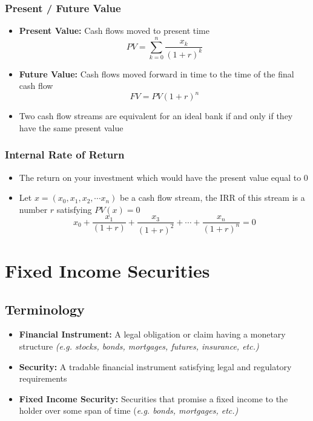 \documentclass[11pt]{article}
\begin{document}
\subsubsection{Present / Future Value}
\begin{itemize}
\item \textbf{Present Value:} Cash flows moved to present time 
$$ PV = \sum_{k=0}^{n} \frac{x_k}{(1+r)^k}$$
\item \textbf{Future Value:} Cash flows moved forward in time to the time of the final cash flow
$$ FV = PV (1+r)^n$$
\item Two cash flow streams are equivalent for an ideal bank if and only if they have the same present value 
\end{itemize}

\subsubsection{Internal Rate of Return}
\begin{itemize}
\item The return on your investment which would have the present value equal to 0
\item Let $x = (x_0, x_1, x_2, \cdots x_n)$ be a cash flow stream, the IRR of this stream is a number $r$ satisfying $PV(x) = 0$ 
$$ x_0 + \frac{x_1}{(1+r)} + \frac{x_3}{(1+r)^2} + \cdots + \frac{x_n}{(1+r)^n} = 0$$
\end{itemize}

\pagebreak

\section{Fixed Income Securities}
\subsection{Terminology}
\begin{itemize}
\item \textbf{Financial Instrument:} A legal obligation or claim having a monetary structure \textit{(e.g. stocks, bonds, mortgages, futures, insurance, etc.)}
\item \textbf{Security:} A tradable financial instrument satisfying legal and regulatory requirements 
\item \textbf{Fixed Income Security:} Securities that promise a fixed income to the holder over some span of time (\textit{e.g. bonds, mortgages, etc.)}
\end{itemize}
\end{document}

